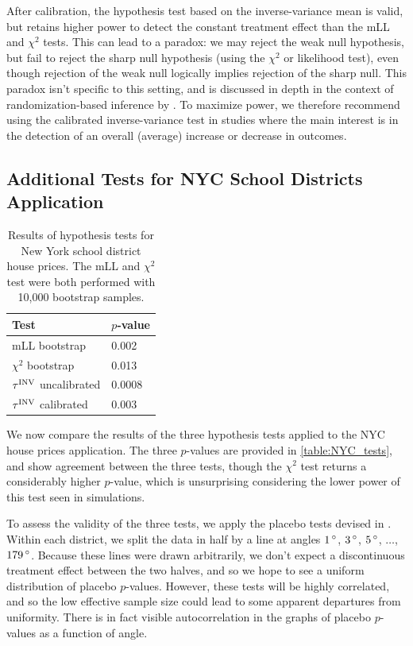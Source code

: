     After calibration, the hypothesis test based on the inverse-variance mean is valid, but retains higher power to detect the constant treatment effect than the mLL and \(\chi^2\) tests.
This can lead to a paradox: we may reject the weak null hypothesis, but fail to reject the sharp null hypothesis (using the \(\chi^2\) or likelihood test), even though rejection of the weak null logically implies rejection of the sharp null.
This paradox isn't specific to this setting, and is discussed in depth in the context of randomization-based inference by \cite{Ding:2014sf}.
To maximize power, we therefore recommend using the calibrated inverse-variance test in studies where the main interest is in the detection of an overall (average) increase or decrease in outcomes.

\subsection{Additional Tests for NYC School Districts Application}
\label{sec:nyc_hypothesis_tests}

\begin{table}[tbp]
    \centering
    \bgroup
    \def\arraystretch{1.1}%
    \begin{tabular}{ll}
        \hline
        Test                   & \(p\)-value \\
        \hline
        mLL bootstrap            & 0.002 \\
        \(\chi^2\) bootstrap     & 0.013 \\
        \(\tau^{\mathrm{INV}}\) uncalibrated & 0.0008 \\
        \(\tau^{\mathrm{INV}}\) calibrated   & 0.003 \\
        \hline
    \end{tabular}
    \egroup
    \caption{
        Results of hypothesis tests for New York school district house prices.
        The mLL and \(\chi^2\) test were both performed with 10,000 bootstrap samples.
        \label{table:NYC_tests}
    }
\end{table}

    We now compare the results of the three hypothesis tests applied to the NYC house prices application.
The three \(p\)-values are provided in \autoref{table:NYC_tests}, and show
agreement between the three tests, though the \(\chi^2\) test returns a considerably higher \(p\)-value, which is unsurprising considering the lower power of this test seen in simulations.

    To assess the validity of the three tests, we apply the placebo tests devised in .
Within each district, we split the data in half by a line at angles \(1\,^\circ\), \(3\,^\circ\), \(5\,^\circ\), \(\dotsc\), \(179\,^\circ\).
Because these lines were drawn arbitrarily, we don't expect a discontinuous treatment effect between the two halves, and so we hope to see a uniform distribution of placebo \(p\)-values.
However, these tests will be highly correlated,
and so the low effective sample size could lead to some apparent departures from uniformity.
There is in fact visible autocorrelation in the graphs of placebo \(p\)-values as a function of angle.

